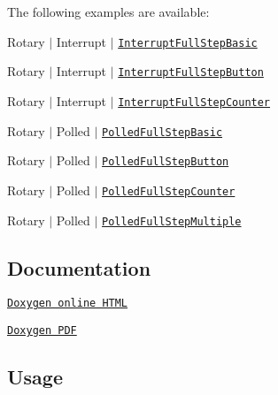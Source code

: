 The following examples are available\+:
\begin{DoxyItemize}
\item Rotary $\vert$ Interrupt $\vert$ \href{https://github.com/Erriez/ErriezRotary/blob/master/examples/Interrupt/InterruptFullStepBasic/InterruptFullStepBasic.ino}{\tt Interrupt\+Full\+Step\+Basic}
\item Rotary $\vert$ Interrupt $\vert$ \href{https://github.com/Erriez/ErriezRotary/blob/master/examples/Interrupt/InterruptFullStepButton/InterruptFullStepButton.ino}{\tt Interrupt\+Full\+Step\+Button}
\item Rotary $\vert$ Interrupt $\vert$ \href{https://github.com/Erriez/ErriezRotary/blob/master/examples/Interrupt/InterruptFullStepCounter/InterruptFullStepCounter.ino}{\tt Interrupt\+Full\+Step\+Counter}
\item Rotary $\vert$ Polled $\vert$ \href{https://github.com/Erriez/ErriezRotary/blob/master/examples/Polled/PolledFullStepBasic/PolledFullStepBasic.ino}{\tt Polled\+Full\+Step\+Basic}
\item Rotary $\vert$ Polled $\vert$ \href{https://github.com/Erriez/ErriezRotary/blob/master/examples/Polled/PolledFullStepButton/PolledFullStepButton.ino}{\tt Polled\+Full\+Step\+Button}
\item Rotary $\vert$ Polled $\vert$ \href{https://github.com/Erriez/ErriezRotary/blob/master/examples/Polled/PolledFullStepCounter/PolledFullStepCounter.ino}{\tt Polled\+Full\+Step\+Counter}
\item Rotary $\vert$ Polled $\vert$ \href{https://github.com/Erriez/ErriezRotary/blob/master/examples/Polled/PolledFullStepMultiple/PolledFullStepMultiple.ino}{\tt Polled\+Full\+Step\+Multiple}
\end{DoxyItemize}

\subsection*{Documentation}


\begin{DoxyItemize}
\item \href{https://Erriez.github.io/ErriezRotaryEncoderFullStep}{\tt Doxygen online H\+T\+ML}
\item \href{https://github.com/Erriez/ErriezRotaryEncoderFullStep/raw/gh-pages/latex/ErriezRotaryEncoderFullStep.pdf}{\tt Doxygen P\+DF}
\end{DoxyItemize}

\subsection*{Usage}

